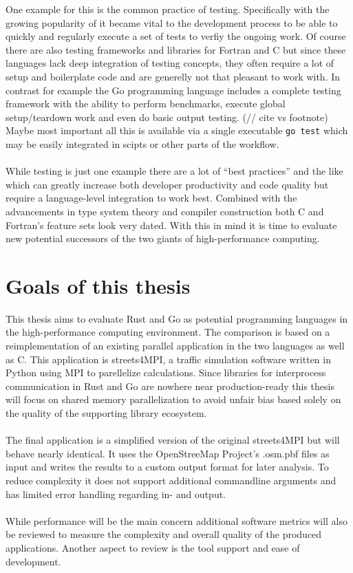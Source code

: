 One example for this is the common practice of testing. Specifically with the growing popularity of  it became vital to the development process to be able to quickly and regularly execute a set of tests to verfiy the ongoing work. Of course there are also testing frameworks and libraries for Fortran and C but since these languages lack deep integration of testing concepts, they often require a lot of setup and boilerplate code and are generelly not that pleasant to work with. In contrast for example the Go programming language includes a complete testing framework with the ability to perform benchmarks, execute global setup/teardown work and even do basic output testing.\cite{GO_TEST} (// cite vs footnote) Maybe most important all this is available via a single executable \lstinline$go test$ which may be easily integrated in scipts or other parts of the workflow.
\\ \\
While testing is just one example there are a lot of ``best practices'' and the like which can greatly increase both developer productivity and code quality but require a language-level integration to work best. Combined with the advancements in type system theory and compiler construction both C and Fortran's feature sets look very dated. With this in mind it is time to evaluate new potential successors of the two giants of high-performance computing.

\section{Goals of this thesis}
\label{sec:Goals}

This thesis aims to evaluate Rust and Go as potential programming languages in the high-performance computing environment. The comparison is based on a reimplementation of an existing parallel application in the two languages as well as C. This application is streets4MPI, a traffic simulation software written in Python using MPI to parellelize calculations. Since libraries for interprocess communication in Rust and Go are nowhere near production-ready this thesis will focus on shared memory parallelization to avoid unfair bias based solely on the quality of the supporting library ecosystem.
\\ \\
The final application is a simplified version of the original streets4MPI but will behave nearly identical. It uses the OpenStreeMap Project's .osm.pbf files as input and writes the results to a custom output format for later analysis. To reduce complexity it does not support additional commandline arguments and has limited error handling regarding in- and output.
\\ \\
While performance will be the main concern additional software metrics will also be reviewed to measure the complexity and overall quality of the produced applications. Another aspect to review is the tool support and ease of development.

